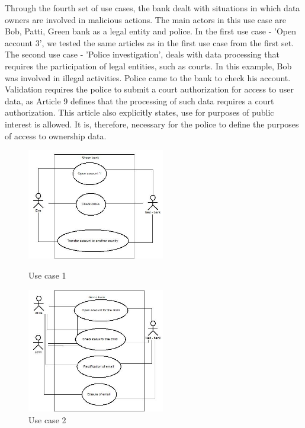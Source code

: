 \documentclass[11pt,english]{article}
\begin{document}
Through the fourth set of use cases, the bank dealt with situations in which data owners are involved in malicious actions. The main actors in this use case are Bob, Patti, Green bank as a legal entity and police. In the first use case - 'Open account 3', we tested the same articles as in the first use case from the first set. The second use case - 'Police investigation', deals with data processing that requires the participation of legal entities, such as courts. In this example, Bob was involved in illegal activities. Police came to the bank to check his account. Validation requires the police to submit a court authorization for access to user data, as Article 9 defines that the processing of such data requires a court authorization. This article also explicitly states, use for purposes of public interest is allowed. It is, therefore, necessary for the police to define the purposes of access to ownership data.
\begin{figure}[H]
\centering
\begin{minipage}{.5\textwidth}
  \centering
  \includegraphics[width=6cm,scale=0.5]{images/use case1.jpg}
  \caption{Use case 1}
  \label{fig:usecase1}
\end{minipage}%
\begin{minipage}{.5\textwidth}
  \centering
  \includegraphics[width=6cm,scale=0.5]{images/use case2.jpg}
  \caption{Use case 2}
  \label{fig:usecase2}
\end{minipage}
\end{figure}
\end{document}
